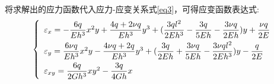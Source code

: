 将求解出的应力函数代入应力-应变关系式\eqref{eq3}，可得应变函数表达式:
\begin{equation}\label{eq26}
    \left\{
        \begin{array}{l}
            \varepsilon_x = -\dfrac{6q}{Eh^3}x^2y+\dfrac{4q+2\nu q}{Eh^3}y^3+(\dfrac{3ql^2}{2Eh^3}-\dfrac{3q}{5Eh}-\dfrac{3\nu q}{2Eh})y+\dfrac{\nu q}{2E} \vspace{1ex}\\
            \varepsilon_y = \dfrac{6\nu q}{Eh^3}x^2y-\dfrac{4\nu q+2q}{Eh^3}y^3+(\dfrac{3q}{2Eh}+\dfrac{3\nu q}{5Eh}-\dfrac{3\nu ql^2}{2Eh^3})y-\dfrac{q}{2E} \vspace{1ex}\\
            \varepsilon_{xy} = \dfrac{6q}{2Gh^3}xy^2-\dfrac{3q}{4Gh}x
        \end{array}
    \right.
\end{equation}  

